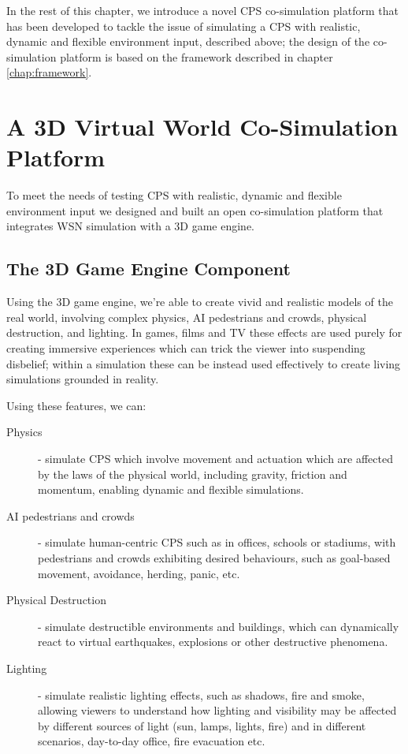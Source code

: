 In the rest of this chapter, we introduce a novel CPS co-simulation platform that has been developed to tackle the issue of simulating a CPS with realistic, dynamic and flexible environment input, described above; the design of the co-simulation platform is based on the framework described in chapter \ref{chap:framework}.


\section{A 3D Virtual World Co-Simulation Platform} %
\label{sec:a_3d_co_simulation_platform}

To meet the needs of testing CPS with realistic, dynamic and flexible environment input we designed and built an open co-simulation platform that integrates WSN simulation with a 3D game engine. 

\subsection{The 3D Game Engine Component} %
\label{sub:a_3d_game_engine}

Using the 3D game engine, we're able to create vivid and realistic models of the real world, involving complex physics, AI pedestrians and crowds, physical destruction, and lighting. In games, films and TV these effects are used purely for creating immersive experiences which can trick the viewer into suspending disbelief; within a simulation these can be instead used effectively to create living simulations grounded in reality. 

Using these features, we can:
\begin{description}
   \item [Physics] - simulate CPS which involve movement and actuation which are affected by the laws of the physical world, including gravity, friction and momentum, enabling dynamic and flexible simulations.
   \item [AI pedestrians and crowds] - simulate human-centric CPS such as in offices, schools or stadiums, with pedestrians and crowds exhibiting desired behaviours, such as goal-based movement, avoidance, herding, panic, etc.
   \item [Physical Destruction] - simulate destructible environments and buildings, which can dynamically react to virtual earthquakes, explosions or other destructive phenomena.
   \item [Lighting] - simulate realistic lighting effects, such as shadows, fire and smoke, allowing viewers to understand how lighting and visibility may be affected by different sources of light (sun, lamps, lights, fire) and in different scenarios, day-to-day office, fire evacuation etc. 
 \end{description} 


